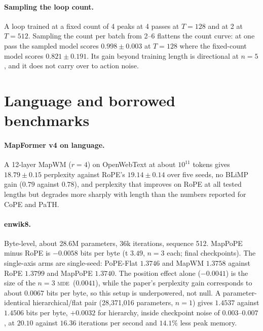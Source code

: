 \documentclass[10pt]{article}
\newcommand{\mde}{\textsc{mde}}
\begin{document}
\paragraph{Sampling the loop count.} A loop trained at a fixed count of 4 peaks at 4 passes at $T=128$ and at 2
at $T=512$. Sampling the count per batch from 2--6 flattens the count curve: at one pass the sampled model scores
$0.998\pm0.003$ at $T=128$ where the fixed-count model scores $0.821\pm0.191$. Its gain beyond training length is
directional at $n=5$, and it does not carry over to action noise. %

\section{Language and borrowed benchmarks}
\label{app:lang}

\paragraph{MapFormer v4 on language.} A 12-layer MapWM ($r=4$) on OpenWebText at about $10^{11}$ tokens gives
$18.79\pm0.15$ perplexity against RoPE's $19.14\pm0.14$ over five seeds, no BLiMP gain ($0.79$ against $0.78$), and
perplexity that improves on RoPE at all tested lengths but degrades more sharply with length than the numbers
reported for CoPE and PaTH. %

\paragraph{enwik8.} Byte-level, about 28.6M parameters, 36k iterations, sequence 512. MapPoPE minus RoPE is
$-0.0058$ bits per byte (t $3.49$, $n=3$ each; final checkpoints). The single-axis arms are single-seed:
PoPE-Flat $1.3746$ and MapWM $1.3758$ against RoPE $1.3799$ and MapPoPE $1.3740$. The position effect alone
($-0.0041$) is the size of the $n=3$ \mde\ ($0.0041$), while the paper's perplexity gain corresponds to about
$0.0067$ bits per byte, so this setup is underpowered, not null.
A parameter-identical hierarchical/flat pair (28,371,016 parameters, $n=1$) gives $1.4537$ against $1.4506$ bits
per byte, $+0.0032$ for hierarchy, inside checkpoint noise of $0.003$--$0.007$, at $20.10$ against $16.36$
iterations per second and $14.1\%$ less peak memory. %
\end{document}
